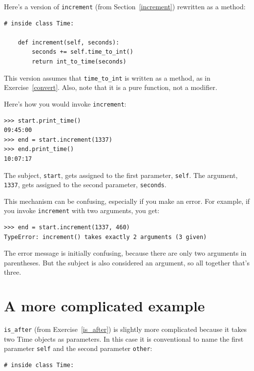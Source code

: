 \documentclass[10pt]{book}
\begin{document}
{Here's a version of {\tt increment} (from Section~\ref{increment})
rewritten as a method:

\beforeverb
\begin{verbatim}
# inside class Time:

    def increment(self, seconds):
        seconds += self.time_to_int()
        return int_to_time(seconds)
\end{verbatim}
\afterverb
%
This version assumes that \verb"time_to_int" is written
as a method, as in Exercise~\ref{convert}.  Also, note that
it is a pure function, not a modifier.

Here's how you would invoke {\tt increment}:

\beforeverb
\begin{verbatim}
>>> start.print_time()
09:45:00
>>> end = start.increment(1337)
>>> end.print_time()
10:07:17
\end{verbatim}
\afterverb
%
The subject, {\tt start}, gets assigned to the first parameter,
{\tt self}.  The argument, {\tt 1337}, gets assigned to the
second parameter, {\tt seconds}.

This mechanism can be confusing, especially if you make an error.
For example, if you invoke {\tt increment} with two arguments, you
get:


\beforeverb
\begin{verbatim}
>>> end = start.increment(1337, 460)
TypeError: increment() takes exactly 2 arguments (3 given)
\end{verbatim}
\afterverb
%
The error message is initially confusing, because there are
only two arguments in parentheses.  But the subject is also
considered an argument, so all together that's three.


\section{A more complicated example}

\verb"is_after" (from Exercise~\ref{is_after}) is slightly more complicated
because it takes two Time objects as parameters.  In this case it is
conventional to name the first parameter {\tt self} and the second
parameter {\tt other}:


\beforeverb
\begin{verbatim}
# inside class Time:


\end{verbatim}}
\end{document}
